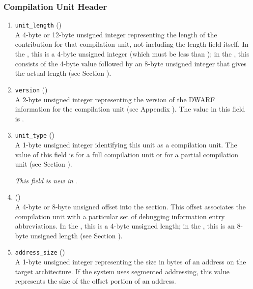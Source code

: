 \subsubsection{Compilation Unit Header}
\label{datarep:compilationunitheader}
\begin{enumerate}[1. ]

\item \texttt{unit\_length} () \\
A 4-byte or 12-byte 
unsigned integer representing the length
of the \dotdebuginfo{}
contribution for that compilation unit,
not including the length field itself. In the \thirtytwobitdwarfformat,
 this is a 4-byte unsigned integer (which must be less
than \xfffffffzero); in the \sixtyfourbitdwarfformat, this consists
of the 4-byte value \wffffffff followed by an 8-byte unsigned
integer that gives the actual length 
(see Section ).

\item  \texttt{version} (\HFTuhalf) \\
A 2-byte unsigned integer representing the version of the
DWARF information for the compilation unit  
(see Appendix ). 
The value in this field is \versiondotdebuginfo.

\item \texttt{unit\_type} (\HFTubyte) \\
A 1-byte unsigned integer identifying this unit as a compilation unit.
The value of this field is 
\DWUTcompile{} for a full compilation unit or
\DWUTpartial{} for a partial compilation unit
(see Section ).

\textit{This field is new in \DWARFVersionV.}

\item \HFNdebugabbrevoffset{} () \\
A 
4-byte or 8-byte unsigned offset into the 
\dotdebugabbrev{}
section. This offset associates the compilation unit with a
particular set of debugging information entry abbreviations. In
the \thirtytwobitdwarfformat, this is a 4-byte unsigned length;
in the \sixtyfourbitdwarfformat, this is an 8-byte unsigned length
(see Section ).

\item \texttt{address\_size} (\HFTubyte) \\
A 1-byte unsigned integer representing the size in bytes of
an address on the target architecture. If the system uses
segmented addressing, this value represents the size of the
offset portion of an address.

\end{enumerate}

